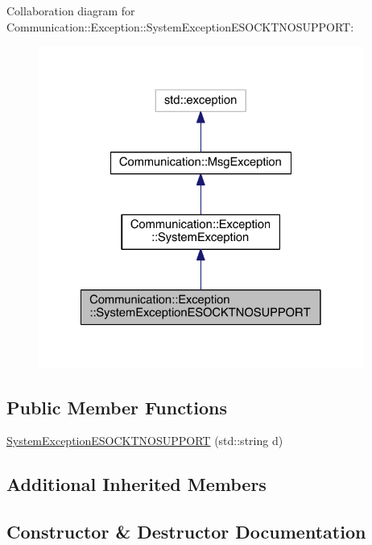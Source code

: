 Collaboration diagram for Communication\+:\+:Exception\+:\+:System\+Exception\+E\+S\+O\+C\+K\+T\+N\+O\+S\+U\+P\+P\+O\+R\+T\+:\nopagebreak
\begin{figure}[H]
\begin{center}
\leavevmode
\includegraphics[width=302pt]{class_communication_1_1_exception_1_1_system_exception_e_s_o_c_k_t_n_o_s_u_p_p_o_r_t__coll__graph}
\end{center}
\end{figure}
\subsection*{Public Member Functions}
\begin{DoxyCompactItemize}
\item 
\hyperlink{class_communication_1_1_exception_1_1_system_exception_e_s_o_c_k_t_n_o_s_u_p_p_o_r_t_a342a1b1ba9ea176c6d89575de9fce53c}{System\+Exception\+E\+S\+O\+C\+K\+T\+N\+O\+S\+U\+P\+P\+O\+R\+T} (std\+::string d)
\end{DoxyCompactItemize}
\subsection*{Additional Inherited Members}


\subsection{Constructor \& Destructor Documentation}
\hypertarget{class_communication_1_1_exception_1_1_system_exception_e_s_o_c_k_t_n_o_s_u_p_p_o_r_t_a342a1b1ba9ea176c6d89575de9fce53c}{}
